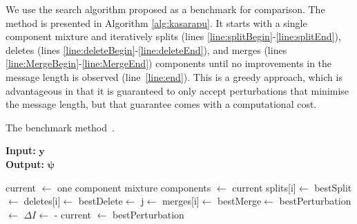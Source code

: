 \documentclass{elsarticle}
\newcommand{\vect}[1]{\boldsymbol{\mathbf{#1}}}
\renewcommand{\vec}[1]{\vect{#1}}
\def\datum{y}
\def\data{\vect{\datum}}
\begin{document}
We use the search algorithm proposed \citep{kasarapu2015minimum} as a benchmark for comparison. The method is presented in Algorithm \ref{alg:kasarapu}. It starts with a single component mixture and iteratively splits (lines \ref{line:splitBegin}-\ref{line:splitEnd}), deletes (lines \ref{line:deleteBegin}-\ref{line:deleteEnd}), and merges (lines \ref{line:MergeBegin}-\ref{line:MergeEnd}) components until no improvements in the message length is observed (line~\ref{line:end}). This is a greedy approach, which is advantageous in that it is guaranteed to only accept perturbations that minimise the message length, but that guarantee comes with a computational cost. 
\begin{algorithm}[H]
\caption{The benchmark method~\cite{kasarapu2015minimum}.}
\label{alg:kasarapu}
{\bf Input:} $\vec\data$ \\
{\bf Output:} $\vec\psi$
\begin{algorithmic}[1]
\State current $\leftarrow$ one component mixture
\State components $\leftarrow$ current
  \label{line:splitBegin}
    \State splits[i]$\leftarrow$ 
  \EndFor
\State  bestSplit$\leftarrow$\label{line:splitEnd} 
  \label{line:deleteBegin}
    \State deletes[i]$\leftarrow$ 
  \EndFor
\State  bestDelete$\leftarrow$ \label{line:deleteEnd}
\EndIf
  \label{line:MergeBegin}
    \State j$\leftarrow$ 
    \State merges[i]$\leftarrow$ 
  \EndFor
\State  bestMerge$\leftarrow$ \label{line:MergeEnd}
\State bestPerturbation $\leftarrow$  
\State $\Delta I \leftarrow$ - 
\State current $\leftarrow$ bestPerturbation
\EndIf
{} \label{line:end}
\EndWhile
\end{algorithmic}
\end{algorithm}
\end{document}

